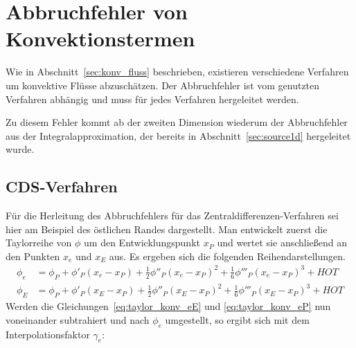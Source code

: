 \section{Abbruchfehler von Konvektionstermen}

Wie in Abschnitt~\ref{sec:konv_fluss} beschrieben, existieren verschiedene Verfahren
um konvektive Flüsse abzuschätzen. Der Abbruchfehler ist vom genutzten Verfahren
abhängig und muss für jedes Verfahren hergeleitet werden.

Zu diesem Fehler kommt ab der zweiten Dimension wiederum der Abbruchfehler aus
der Integralapproximation, der bereits in Abschnitt~\ref{sec:source1d} hergeleitet wurde.

\subsection{CDS-Verfahren}
\label{sec:te_cds}

Für die Herleitung des Abbruchfehlers für das Zentraldifferenzen-Verfahren sei hier am Beispiel des östlichen Randes dargestellt.
Man entwickelt zuerst die Taylorreihe von $\phi$ um den Entwicklungspunkt $x_P$ und wertet sie anschließend
an den Punkten $x_e$ und $x_E$ aus. Es ergeben sich die folgenden Reihendarstellungen.
\begin{align}
  \phi_e &= \phi_P + \phi'_P(x_e-x_P)+\frac{1}{2}\phi''_P(x_e-x_P)^2
  +\frac{1}{6}\phi'''_P(x_e-x_P)^3+HOT
  \label{eq:taylor_konv_eP}\\
  \phi_E &= \phi_P + \phi'_P(x_E-x_P)+\frac{1}{2}\phi''_P(x_E-x_P)^2
  +\frac{1}{6}\phi'''_P(x_E-x_P)^3+HOT
  \label{eq:taylor_konv_eE}
\end{align}
Werden die Gleichungen~\eqref{eq:taylor_konv_eE} und \eqref{eq:taylor_konv_eP} nun
voneinander subtrahiert und nach $\phi_e$ umgestellt, so ergibt sich mit dem
Interpolationsfaktor $\gamma_e$:

